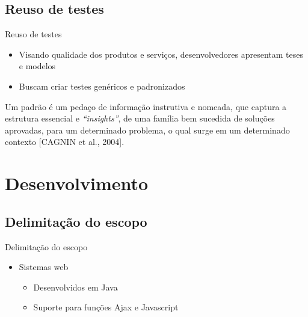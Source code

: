 \documentclass{beamer}
\begin{document}
\subsection{Reuso de testes}
\begin{frame}{Reuso de testes}
    \begin{itemize}
        \item Visando qualidade dos produtos e serviços, desenvolvedores apresentam teses e modelos
        \item Buscam criar testes genéricos e padronizados
    \end{itemize}
    \begin{block}{}
         Um padrão é um pedaço de informação instrutiva e nomeada, que captura a estrutura essencial
e \emph{“insights”}, de uma família bem sucedida de soluções aprovadas, para um determinado problema, o qual surge em um determinado contexto [CAGNIN et al., 2004].
    \end{block}
\end{frame}
\section{Desenvolvimento}
\subsection{Delimitação do escopo}
\begin{frame}{Delimitação do escopo}
	\begin{itemize}
		\item Sistemas web
		\begin{itemize}
			\item Desenvolvidos em Java
			\item Suporte para funções Ajax e Javascript
		\end{itemize}
	\end{itemize}
\end{frame}
\end{document}
